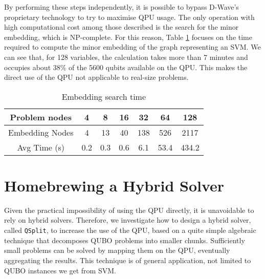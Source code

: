 \documentclass{ceurart}
\begin{document}
By performing these steps independently, it is possible to bypass D-Wave's proprietary technology to try to maximise QPU usage. The only operation with high computational cost among those described is the search for the minor embedding, which is NP-complete. For this reason, Table \ref{tab:embedding} focuses on the time required to compute the minor embedding of the graph representing an SVM. We can see that, for 128 variables, the calculation takes more than 7 minutes and occupies about 38\% of the 5600 qubits available on the QPU. This makes the direct use of the QPU not applicable to real-size problems.

\begin{table}
    \caption{Embedding search time}
    \label{tab:embedding}
    \begin{tabular}{ccccccc}
        \toprule
        Problem nodes & 4 & 8 & 16 & 32 & 64 & 128 \\  
        \midrule
        Embedding Nodes & 4 & 13 & 40 & 138 & 526 & 2117 \\
        Avg Time (s) & 0.2 & 0.3 & 0.6 & 6.1 & 53.4 & 434.2 \\
        \bottomrule
    \end{tabular}
\end{table}

\section{Homebrewing a Hybrid Solver}

Given the practical impossibility of using the QPU directly, it is unavoidable to rely on hybrid solvers. Therefore, we investigate how to design a hybrid solver, called \verb|QSplit|, to increase the use of the QPU, based on a quite simple algebraic technique that decomposes QUBO problems into smaller chunks. Sufficiently small problems can be solved by mapping them on the QPU, eventually aggregating the results. This technique is of general application, not limited to QUBO instances we get from SVM.
\end{document}
